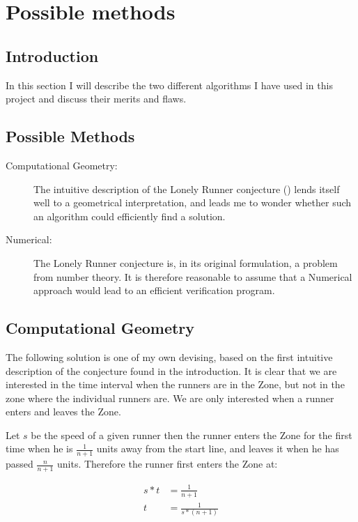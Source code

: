 \section{Possible methods}
\label{choiceOfMethod}

\subsection{Introduction}
In this section I will describe the two different algorithms I have used in this project and discuss their merits and flaws.\\

\subsection{Possible Methods}

\begin{description}
\item[Computational Geometry:] The intuitive description of the Lonely Runner conjecture () lends itself well to a geometrical interpretation, and leads me to wonder whether such an algorithm could efficiently find a solution.

\item[Numerical:] The Lonely Runner conjecture is, in its original formulation, a problem from number theory. It is therefore reasonable to assume that a Numerical approach would lead to an efficient verification program.
\end{description}

\subsection{Computational Geometry}
\label{compGeo}
The following solution is one of my own devising, based on the first intuitive description of the conjecture found in the introduction. It is clear that we are interested in the time interval when the runners are in the Zone, but not in the zone where the individual runners are. We are only interested when a runner enters and leaves the Zone. 

Let $s$ be the speed of a given runner then the runner enters the Zone for the first time when he is $\frac{1}{n+1}$ units away from the start line, and leaves it when he has passed $\frac{n}{n+1}$ units.
Therefore the runner first enters the Zone at: 

\begin{equation}
\label{eqa:speedOne}
\begin{split}
s * t &= \frac{1}{n+1} \\
t &= \frac{1}{s * (n+1)}
\end{split}
\end{equation}

